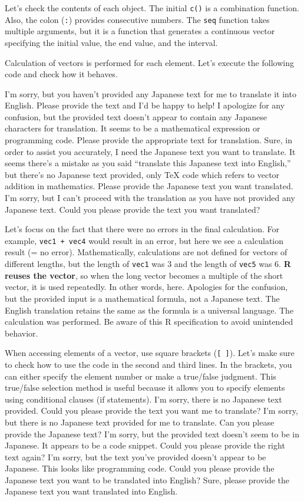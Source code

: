 \documentclass[
  a4paper,
]{book}
\begin{document}
Let's check the contents of each object. The initial \texttt{c()} is a
combination function. Also, the colon (\texttt{:}) provides consecutive
numbers. The \texttt{seq} function takes multiple arguments, but it is a
function that generates a continuous vector specifying the initial
value, the end value, and the interval.

Calculation of vectors is performed for each element. Let's execute the
following code and check how it behaves.

I'm sorry, but you haven't provided any Japanese text for me to
translate it into English. Please provide the text and I'd be happy to
help! I apologize for any confusion, but the provided text doesn't
appear to contain any Japanese characters for translation. It seems to
be a mathematical expression or programming code. Please provide the
appropriate text for translation. Sure, in order to assist you
accurately, I need the Japanese text you want to translate. It seems
there's a mistake as you said ``translate this Japanese text into
English,'' but there's no Japanese text provided, only TeX code which
refers to vector addition in mathematics. Please provide the Japanese
text you want translated. I'm sorry, but I can't proceed with the
translation as you have not provided any Japanese text. Could you please
provide the text you want translated?

Let's focus on the fact that there were no errors in the final
calculation. For example, \texttt{vec1\ +\ vec4} would result in an
error, but here we see a calculation result (= no error).
Mathematically, calculations are not defined for vectors of different
lengths, but the length of \texttt{vec1} was 3 and the length of
\texttt{vec5} was 6. \textbf{R reuses the vector}, so when the long
vector becomes a multiple of the short vector, it is used repeatedly. In
other words, here. Apologies for the confusion, but the provided input
is a mathematical formula, not a Japanese text. The English translation
retains the same as the formula is a universal language. The calculation
was performed. Be aware of this R specification to avoid unintended
behavior.

When accessing elements of a vector, use square brackets
(\texttt{{[}\ {]}}). Let's make sure to check how to use the code in the
second and third lines. In the brackets, you can either specify the
element number or make a true/false judgment. This true/false selection
method is useful because it allows you to specify elements using
conditional clauses (if statements). I'm sorry, there is no Japanese
text provided. Could you please provide the text you want me to
translate? I'm sorry, but there is no Japanese text provided for me to
translate. Can you please provide the Japanese text? I'm sorry, but the
provided text doesn't seem to be in Japanese. It appears to be a code
snippet. Could you please provide the right text again? I'm sorry, but
the text you've provided doesn't appear to be Japanese. This looks like
programming code. Could you please provide the Japanese text you want to
be translated into English? Sure, please provide the Japanese text you
want translated into English.
\end{document}
